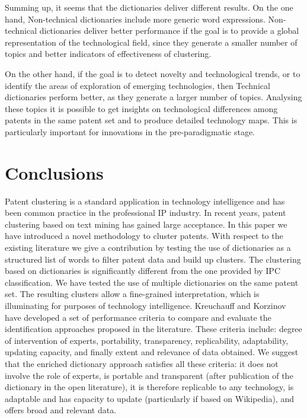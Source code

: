 \documentclass[]{book}
\begin{document}
Summing up, it seems that the dictionaries deliver different results. On
the one hand, Non-technical dictionaries include more generic word
expressions. Non-technical dictionaries deliver better performance if
the goal is to provide a global representation of the technological
field, since they generate a smaller number of topics and better
indicators of effectiveness of clustering.

On the other hand, if the goal is to detect novelty and technological
trends, or to identify the areas of exploration of emerging
technologies, then Technical dictionaries perform better, as they
generate a larger number of topics. Analysing these topics it is
possible to get insights on technological differences among patents in
the same patent set and to produce detailed technology maps. This is
particularly important for innovations in the pre-paradigmatic stage.

\section{Conclusions}\label{conclusions}

Patent clustering is a standard application in technology intelligence
and has been common practice in the professional IP industry. In recent
years, patent clustering based on text mining has gained large
acceptance. In this paper we have introduced a novel methodology to
cluster patents. With respect to the existing literature we give a
contribution by testing the use of dictionaries as a structured list of
words to filter patent data and build up clusters. The clustering based
on dictionaries is significantly different from the one provided by IPC
classification. We have tested the use of multiple dictionaries on the
same patent set. The resulting clusters allow a fine-grained
interpretation, which is illuminating for purposes of technology
intelligence. Kreuchauff and Korzinov \citep{kreuchauff2017patent} have
developed a set of performance criteria to compare and evaluate the
identification approaches proposed in the literature. These criteria
include: degree of intervention of experts, portability, transparency,
replicability, adaptability, updating capacity, and finally extent and
relevance of data obtained. We suggest that the enriched dictionary
approach satisfies all these criteria: it does not involve the role of
experts, is portable and transparent (after publication of the
dictionary in the open literature), it is therefore replicable to any
technology, is adaptable and has capacity to update (particularly if
based on Wikipedia), and offers broad and relevant data.
\end{document}

